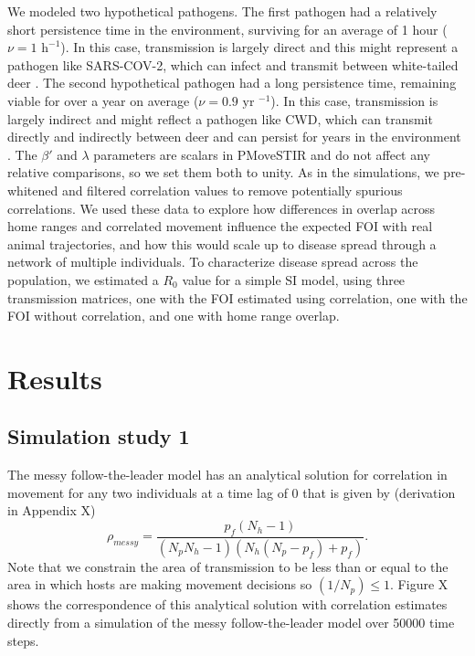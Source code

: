 \documentclass[letterpaper]{article}
\begin{document}
We modeled two hypothetical pathogens. The first pathogen had a relatively short persistence time in the environment, surviving for an average of 1 hour  ($\nu=1\text{ h}^{-1 }$). In this case, transmission is largely direct and this might represent a pathogen like SARS-COV-2, which can infect and transmit between white-tailed deer \citep{Hale2022}. The second hypothetical pathogen had a long persistence time, remaining viable for over a year on average ($\nu=0.9 \text{ yr }^{-1}$). In this case, transmission is largely indirect and might reflect a pathogen like CWD, which can transmit directly and indirectly between deer and can persist for years in the environment \citep{Saunders2012a}. The $\beta'$ and $\lambda$ parameters are scalars in PMoveSTIR and do not affect any relative comparisons, so we set them both to unity. As in the simulations, we pre-whitened and filtered correlation values to remove potentially spurious correlations. 
We used these data to explore how differences in overlap across home ranges and correlated movement influence the expected FOI with real animal trajectories, and how this would scale up to disease spread through a network of multiple individuals. To characterize disease spread across the population, we estimated a $R_0$ value for a simple SI model, using three transmission matrices, one with the FOI estimated using correlation, one with the FOI without correlation, and one with home range overlap. 

\section*{Results}

\subsection*{Simulation study 1}

The messy follow-the-leader model has an analytical solution for correlation in movement for any two individuals at a time lag of 0 that is given by (derivation in Appendix X)
\begin{equation}
    \rho_{messy} = \frac{p_f(N_h - 1)}{(N_p N_h - 1)(N_h(N_p - p_f) + p_f)}.
    \label{eq:messy_leader}
\end{equation}
Note that we constrain the area of transmission to be less than or equal to the area in which hosts are making movement decisions so $(1 / N_p) \leq 1$. Figure X shows the correspondence of this analytical solution with correlation estimates directly from a simulation of the messy follow-the-leader model over 50000 time steps.
\end{document}
